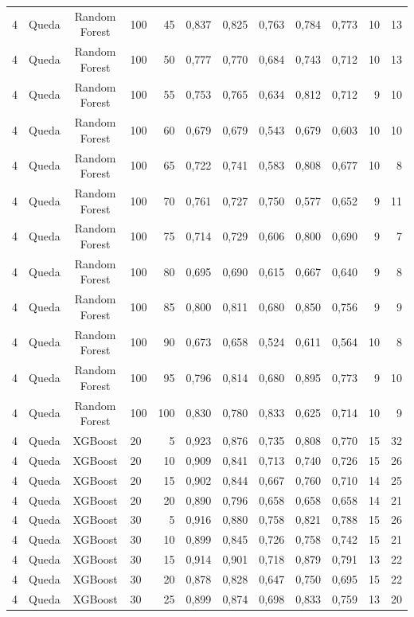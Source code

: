 \begin{longtable}{ccclrrrrrrrr}
4 & Queda & Random Forest & 100 & 45 & 0,837 & 0,825 & 0,763 & 0,784 & 0,773 & 10 & 13 \\
4 & Queda & Random Forest & 100 & 50 & 0,777 & 0,770 & 0,684 & 0,743 & 0,712 & 10 & 13 \\
4 & Queda & Random Forest & 100 & 55 & 0,753 & 0,765 & 0,634 & 0,812 & 0,712 & 9 & 10 \\
4 & Queda & Random Forest & 100 & 60 & 0,679 & 0,679 & 0,543 & 0,679 & 0,603 & 10 & 10 \\
4 & Queda & Random Forest & 100 & 65 & 0,722 & 0,741 & 0,583 & 0,808 & 0,677 & 10 & 8 \\
4 & Queda & Random Forest & 100 & 70 & 0,761 & 0,727 & 0,750 & 0,577 & 0,652 & 9 & 11 \\
4 & Queda & Random Forest & 100 & 75 & 0,714 & 0,729 & 0,606 & 0,800 & 0,690 & 9 & 7 \\
4 & Queda & Random Forest & 100 & 80 & 0,695 & 0,690 & 0,615 & 0,667 & 0,640 & 9 & 8 \\
4 & Queda & Random Forest & 100 & 85 & 0,800 & 0,811 & 0,680 & 0,850 & 0,756 & 9 & 9 \\
4 & Queda & Random Forest & 100 & 90 & 0,673 & 0,658 & 0,524 & 0,611 & 0,564 & 10 & 8 \\
4 & Queda & Random Forest & 100 & 95 & 0,796 & 0,814 & 0,680 & 0,895 & 0,773 & 9 & 10 \\
4 & Queda & Random Forest & 100 & 100 & 0,830 & 0,780 & 0,833 & 0,625 & 0,714 & 10 & 9 \\
4 & Queda & XGBoost & 20 & 5 & 0,923 & 0,876 & 0,735 & 0,808 & 0,770 & 15 & 32 \\
4 & Queda & XGBoost & 20 & 10 & 0,909 & 0,841 & 0,713 & 0,740 & 0,726 & 15 & 26 \\
4 & Queda & XGBoost & 20 & 15 & 0,902 & 0,844 & 0,667 & 0,760 & 0,710 & 14 & 25 \\
4 & Queda & XGBoost & 20 & 20 & 0,890 & 0,796 & 0,658 & 0,658 & 0,658 & 14 & 21 \\
4 & Queda & XGBoost & 30 & 5 & 0,916 & 0,880 & 0,758 & 0,821 & 0,788 & 15 & 26 \\
4 & Queda & XGBoost & 30 & 10 & 0,899 & 0,845 & 0,726 & 0,758 & 0,742 & 15 & 21 \\
4 & Queda & XGBoost & 30 & 15 & 0,914 & 0,901 & 0,718 & 0,879 & 0,791 & 13 & 22 \\
4 & Queda & XGBoost & 30 & 20 & 0,878 & 0,828 & 0,647 & 0,750 & 0,695 & 15 & 22 \\
4 & Queda & XGBoost & 30 & 25 & 0,899 & 0,874 & 0,698 & 0,833 & 0,759 & 13 & 20 \\

\end{longtable}
